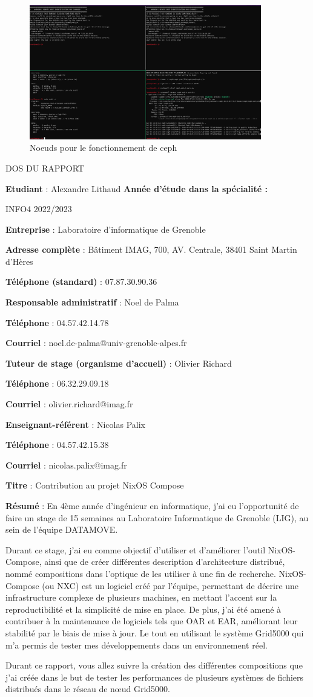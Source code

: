 \documentclass[a4paper,french,12pt, titlepage]{article}
\makeatletter
\newcommand{\makefooter}{%
  \makefooterhooka
}
\newcommand{\makefooterhooka}{%
    \begin{center}
        \begin{Large}
        DOS DU RAPPORT
        \end{Large}
    \end{center}
    
    
    \textbf{Etudiant} : Alexandre Lithaud
    \hfill \textbf{Année d’étude dans la spécialité :}
    
    \hfill INFO4 2022/2023
    
    \hfill
    
    \textbf{Entreprise} : Laboratoire d'informatique de Grenoble 

    \textbf{Adresse complète} : Bâtiment IMAG, 700, AV. Centrale, 38401
Saint Martin d'Hères

    \textbf{Téléphone (standard)} : 07.87.30.90.36
    
    \hfill
    
    \textbf{Responsable administratif} : Noel de Palma 

    \textbf{Téléphone} : 04.57.42.14.78

    \textbf{Courriel} : noel.de-palma@univ-grenoble-alpes.fr

    \hfill
    
    \textbf{Tuteur de stage (organisme d’accueil)} : Olivier Richard

    \textbf{Téléphone} : 06.32.29.09.18

    \textbf{Courriel} : olivier.richard@imag.fr
    
    \hfill
    
    \textbf{Enseignant-référent} : Nicolas Palix

    \textbf{Téléphone} : 04.57.42.15.38 

    \textbf{Courriel} : nicolas.palix@imag.fr 

    \hfill
    
    \textbf{Titre} : Contribution au projet NixOS Compose
    
    \hfill

    \textbf{Résumé} : En 4ème année d'ingénieur en informatique, j'ai eu
l'opportunité de faire un stage de 15 semaines au Laboratoire
Informatique de Grenoble (LIG), au sein de l'équipe DATAMOVE.\newline

Durant ce stage, j'ai eu comme objectif d'utiliser et d'améliorer
l'outil NixOS-Compose, ainsi que de créer différentes description
d'architecture distribué, nommé compositions dans l'optique de les
utiliser à une fin de recherche. NixOS-Compose (ou NXC) est un logiciel
créé par l'équipe, permettant de décrire une infrastructure complexe de
plusieurs machines, en mettant l'accent sur la reproductibilité et la
simplicité de mise en place. De plus, j'ai été amené à contribuer à la
maintenance de logiciels tels que OAR et EAR, améliorant leur stabilité
par le biais de mise à jour. Le tout en utilisant le système Grid5000
qui m'a permis de tester mes développements dans un environnement
réel.\newline

Durant ce rapport, vous allez suivre la création des différentes
compositions que j'ai créée dans le but de tester les performances de
plusieurs systèmes de fichiers distribués dans le réseau de nœud
Grid5000.
}
\makeatother
\begin{document}
\begin{figure}
\centering
\includegraphics[width=0.9\textwidth,height=0.9\textheight,keepaspectratio]{annexe/ceph_osd_up.png}
\caption{Noeuds pour le fonctionnement de ceph}
\end{figure}

\begin{titlingpage}
\clearpage
\makefooter
\end{titlingpage}
\end{document}
